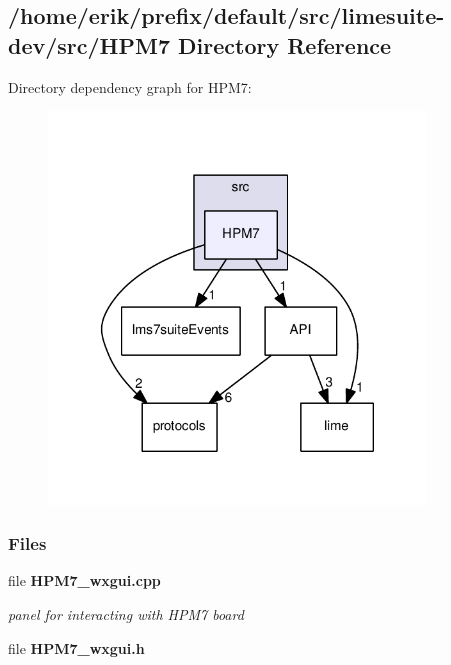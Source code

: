 \subsection{/home/erik/prefix/default/src/limesuite-\/dev/src/\+H\+P\+M7 Directory Reference}
\label{dir_afa5eb69600ecf8d08b0a8ea1a3a4d31}
Directory dependency graph for H\+P\+M7\+:
\nopagebreak
\begin{figure}[H]
\begin{center}
\leavevmode
\includegraphics[width=284pt]{dir_afa5eb69600ecf8d08b0a8ea1a3a4d31_dep}
\end{center}
\end{figure}
\subsubsection*{Files}
\begin{DoxyCompactItemize}
\item 
file {\bf H\+P\+M7\+\_\+wxgui.\+cpp}
\begin{DoxyCompactList}\small\item\em panel for interacting with H\+P\+M7 board \end{DoxyCompactList}\item 
file {\bf H\+P\+M7\+\_\+wxgui.\+h}
\end{DoxyCompactItemize}
